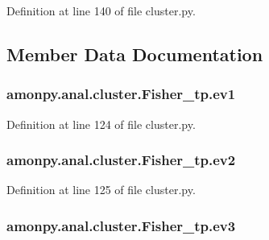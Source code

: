 Definition at line 140 of file cluster.\-py.



\subsection{Member Data Documentation}
\hypertarget{classamonpy_1_1anal_1_1cluster_1_1_fisher__tp_a4b282e58dde2fdfc1c815e6f6d2fba5f}{
\subsubsection[{ev1}]{\setlength{\rightskip}{0pt plus 5cm}amonpy.\-anal.\-cluster.\-Fisher\-\_\-tp.\-ev1}}\label{classamonpy_1_1anal_1_1cluster_1_1_fisher__tp_a4b282e58dde2fdfc1c815e6f6d2fba5f}


Definition at line 124 of file cluster.\-py.

\hypertarget{classamonpy_1_1anal_1_1cluster_1_1_fisher__tp_a5aad4ba062a0103b45387fea062e00f9}{
\subsubsection[{ev2}]{\setlength{\rightskip}{0pt plus 5cm}amonpy.\-anal.\-cluster.\-Fisher\-\_\-tp.\-ev2}}\label{classamonpy_1_1anal_1_1cluster_1_1_fisher__tp_a5aad4ba062a0103b45387fea062e00f9}


Definition at line 125 of file cluster.\-py.

\hypertarget{classamonpy_1_1anal_1_1cluster_1_1_fisher__tp_a222ee1411c4db3f384af8421292f2ec1}{
\subsubsection[{ev3}]{\setlength{\rightskip}{0pt plus 5cm}amonpy.\-anal.\-cluster.\-Fisher\-\_\-tp.\-ev3}}\label{classamonpy_1_1anal_1_1cluster_1_1_fisher__tp_a222ee1411c4db3f384af8421292f2ec1}


